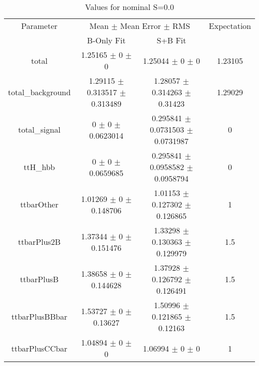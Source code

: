 \begin{table}
\centering
\caption{Values for nominal S=0.0}
\begin{tabular}{cccc}
\toprule
Parameter & \multicolumn{2}{c}{Mean $\pm$ Mean Error $\pm$ RMS} & Expectation\\
 & B-Only Fit & S+B Fit & \\
\midrule
total & \num{1.25165} $\pm$ \num{0} $\pm$ \num{0} & \num{1.25044} $\pm$ \num{0} $\pm$ \num{0} & \num{1.23105}\\
total\_background & \num{1.29115} $\pm$ \num{0.313517} $\pm$ \num{0.313489} & \num{1.28057} $\pm$ \num{0.314263} $\pm$ \num{0.31423} & \num{1.29029}\\
total\_signal & \num{0} $\pm$ \num{0} $\pm$ \num{0.0623014} & \num{0.295841} $\pm$ \num{0.0731503} $\pm$ \num{0.0731987} & \num{0}\\
ttH\_hbb & \num{0} $\pm$ \num{0} $\pm$ \num{0.0659685} & \num{0.295841} $\pm$ \num{0.0958582} $\pm$ \num{0.0958794} & \num{0}\\
ttbarOther & \num{1.01269} $\pm$ \num{0} $\pm$ \num{0.148706} & \num{1.01153} $\pm$ \num{0.127302} $\pm$ \num{0.126865} & \num{1}\\
ttbarPlus2B & \num{1.37344} $\pm$ \num{0} $\pm$ \num{0.151476} & \num{1.33298} $\pm$ \num{0.130363} $\pm$ \num{0.129979} & \num{1.5}\\
ttbarPlusB & \num{1.38658} $\pm$ \num{0} $\pm$ \num{0.144628} & \num{1.37928} $\pm$ \num{0.126792} $\pm$ \num{0.126491} & \num{1.5}\\
ttbarPlusBBbar & \num{1.53727} $\pm$ \num{0} $\pm$ \num{0.13627} & \num{1.50996} $\pm$ \num{0.121865} $\pm$ \num{0.12163} & \num{1.5}\\
ttbarPlusCCbar & \num{1.04894} $\pm$ \num{0} $\pm$ \num{0} & \num{1.06994} $\pm$ \num{0} $\pm$ \num{0} & \num{1}\\
\bottomrule
\end{tabular}
\end{table}